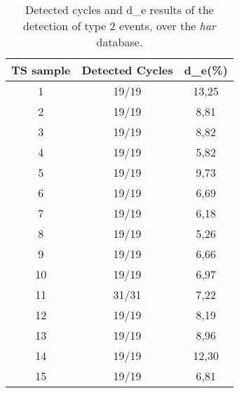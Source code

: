 \begin{table}[ht]
\caption[Detected cycles and \gls{d_e} results of the detection of type 2 events, over the \textit{\gls{har}} database]{Detected cycles and \gls{d_e} results of the detection of type 2 events, over the \textit{\gls{har}} database.}
\label{tab:har_results}
\centering
\begin{tabular}{ccc}
\toprule
TS sample & Detected Cycles & \gls{d_e}(\%) \\ \midrule
1         & 19/19           & 13,25                                                                                   \\
2         & 19/19           & 8,81                                                                                    \\
3         & 19/19           & 8,82                                                                                    \\
4         & 19/19           & 5,82                                                                                    \\
5         & 19/19           & 9,73                                                                                    \\
6         & 19/19           & 6,69                                                                                    \\
7         & 19/19           & 6,18                                                                                    \\
8         & 19/19           & 5,26                                                                                    \\
9         & 19/19           & 6,66                                                                                    \\
10        & 19/19           & 6,97                                                                                    \\
11        & 31/31           & 7,22                                                                                    \\
12        & 19/19           & 8,19                                                                                    \\
13        & 19/19           & 8,96                                                                                    \\
14        & 19/19           & 12,30                                                                                   \\
15        & 19/19           & 6,81                    
\\
\bottomrule
\end{tabular}
\end{table}

